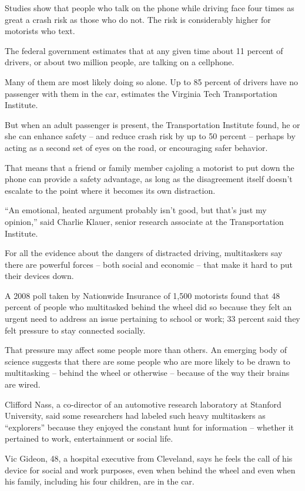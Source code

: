﻿\documentclass[12pt]{article}
\begin{document}
Studies show that people who talk on the phone while driving face four times as great a crash risk
as those who do not. The risk is considerably higher for motorists who text.

The federal government estimates that at any given time about 11 percent of drivers, or about two
million people, are talking on a cellphone.

Many of them are most likely doing so alone. Up to 85 percent of drivers have no passenger with them
in the car, estimates the Virginia Tech Transportation Institute.

But when an adult passenger is present, the Transportation Institute found, he or she can enhance
safety -- and reduce crash risk by up to 50 percent -- perhaps by acting as a second set of eyes on
the road, or encouraging safer behavior.

That means that a friend or family member cajoling a motorist to put down the phone can provide a
safety advantage, as long as the disagreement itself doesn't escalate to the point where it becomes
its own distraction.

``An emotional, heated argument probably isn't good, but that's just my opinion,'' said Charlie
Klauer, senior research associate at the Transportation Institute.

For all the evidence about the dangers of distracted driving, multitaskers say there are powerful
forces -- both social and economic -- that make it hard to put their devices down.

A 2008 poll taken by Nationwide Insurance of 1,500 motorists found that 48 percent of people who
multitasked behind the wheel did so because they felt an urgent need to address an issue pertaining
to school or work; 33 percent said they felt pressure to stay connected socially.

That pressure may affect some people more than others. An emerging body of science suggests that
there are some people who are more likely to be drawn to multitasking -- behind the wheel or
otherwise -- because of the way their brains are wired.

Clifford Nass, a co-director of an automotive research laboratory at Stanford University, said some
researchers had labeled such heavy multitaskers as ``explorers'' because they enjoyed the constant
hunt for information -- whether it pertained to work, entertainment or social life.

Vic Gideon, 48, a hospital executive from Cleveland, says he feels the call of his device for social
and work purposes, even when behind the wheel and even when his family, including his four children,
are in the car.
\end{document}
